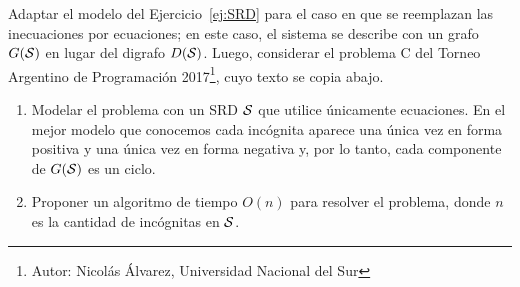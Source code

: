 
 \item Adaptar el modelo del Ejercicio~\ref{ej:SRD} para el caso en que se reemplazan las inecuaciones por ecuaciones; en este caso, el sistema se describe con un grafo $G({\cal S})$ en lugar del digrafo $D({\cal S})$.  Luego, considerar el problema C del Torneo Argentino de Programación 2017\footnote{Autor: Nicolás Álvarez, Universidad Nacional del Sur}, cuyo texto se copia abajo.

 \begin{enumerate}[label=$\alph*$.,ref=$\alph*$]
  \item Modelar el problema con un SRD ${\cal S}$ que utilice únicamente ecuaciones.  En el mejor modelo que conocemos cada incógnita aparece una única vez en forma positiva y una única vez en forma negativa y, por lo tanto, cada componente de $G({\cal S})$ es un ciclo.
  \item Proponer un algoritmo de tiempo $O(n)$ para resolver el problema, donde $n$ es la cantidad de incógnitas en ${\cal S}$.
 \end{enumerate}

